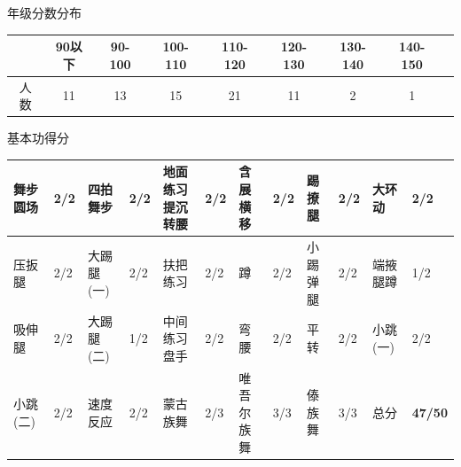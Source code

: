 \documentclass{article}
\begin{document}
\begin{CJK*}{UTF8}{gbsn}
\begin{tabular}{m{} m{}}
\\
\end{tabular}


\begin{center}
年级分数分布



\begin{tabular}{|c|c|c|c|c|c|c|c|c|}
    \hline

    &90以下&90-100&100-110&110-120&120-130&130-140&140-150 \\ \hline
    人数 &11&13&15&21&11&2&1\\ \hline
    
\end{tabular}



基本功得分


\vspace{0.3cm}

\begin{tabular}{|>{\normalsize}p{}>{\normalsize}p{}|>{\normalsize}p{}>{\normalsize}p{}|>{\normalsize}p{}>{\normalsize}p{}|>{\normalsize}p{}>{\normalsize}p{}|>{\normalsize}p{}>{\normalsize}p{}|>{\normalsize}p{}>{\normalsize}p{}|}
    \hline
    \rule{0pt}{2.5ex}舞步 圆场 & 2/2 & 四拍舞步 & 2/2 & 地面练习 提沉转腰 & 2/2 & 含展横移 & 2/2 & 踢撩腿 & 2/2 & 大环动 & 2/2 \\ \hline
    \rule{0pt}{2.5ex}压扳腿 & 2/2 & 大踢腿(一) & 2/2 & 扶把练习 & 2/2 & 蹲 & 2/2 & 小踢弹腿 & 2/2 & 端掖腿蹲 & 1/2 \\ \hline
    \rule{0pt}{2.5ex}吸伸腿 & 2/2 & 大踢腿(二) & 1/2 & 中间练习 盘手 & 2/2 & 弯腰 & 2/2 & 平转 & 2/2 & 小跳(一) & 2/2 \\ \hline
    \rule{0pt}{2.5ex}小跳(二) & 2/2 & 速度反应 & 2/2 & 蒙古族舞 & 2/3 & 唯吾尔族舞 & 3/3 & 傣族舞 & 3/3 & 总分 & \textbf{47/50} \\ \hline
\end{tabular}


\end{center}
\end{CJK*}
\end{document}
